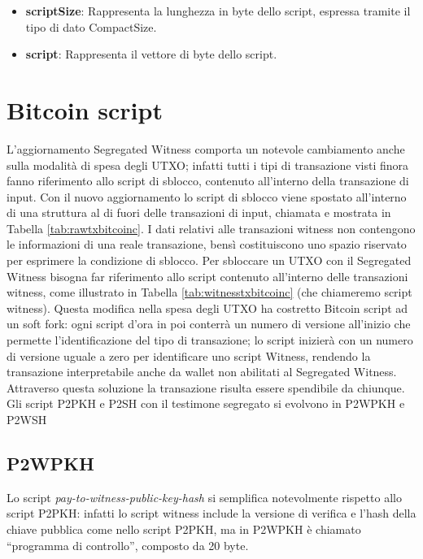 \begin{itemize}
  \item {\bf scriptSize\/}: Rappresenta la lunghezza in byte dello script, espressa tramite il tipo di dato CompactSize.
  \item {\bf script\/}: Rappresenta il vettore di byte dello script.
\end{itemize}
\leavevmode
\section{Bitcoin script}
\label{sec:bitcoinScriptBitcoinCore}

L’aggiornamento Segregated Witness comporta un notevole cambiamento anche sulla modalità di spesa degli UTXO; infatti tutti i tipi di transazione visti finora fanno riferimento allo script di sblocco, contenuto all’interno della transazione di input.
Con il nuovo aggiornamento lo script di sblocco viene spostato all’interno di una struttura al di fuori delle transazioni di input, chiamata  e mostrata in Tabella \ref{tab:rawtxbitcoinc}.
I dati relativi alle transazioni witness non contengono le informazioni di una reale transazione, bensì costituiscono uno spazio riservato per esprimere la condizione di sblocco.
Per sbloccare un UTXO con il Segregated Witness bisogna far riferimento allo script contenuto all’interno delle transazioni witness, come illustrato in Tabella \ref{tab:witnesstxbitcoinc} (che chiameremo script witness). Questa modifica nella spesa degli UTXO ha costretto Bitcoin script ad un soft fork: ogni script d’ora in poi conterrà un numero di versione all’inizio che permette l’identificazione del tipo di transazione; lo script inizierà con un numero di versione uguale a zero per identificare uno script Witness, rendendo la transazione interpretabile anche da wallet non abilitati al Segregated Witness. Attraverso questa soluzione la transazione risulta essere spendibile da chiunque.
Gli script P2PKH e P2SH con il testimone segregato si evolvono in P2WPKH e P2WSH

\subsection{P2WPKH}

Lo script {\it pay-to-witness-public-key-hash \/} si semplifica notevolmente rispetto allo script P2PKH: infatti lo script witness include la versione di verifica e l’hash della chiave pubblica come nello script  P2PKH,  ma in P2WPKH è chiamato “programma di controllo”, composto da 20 byte.

